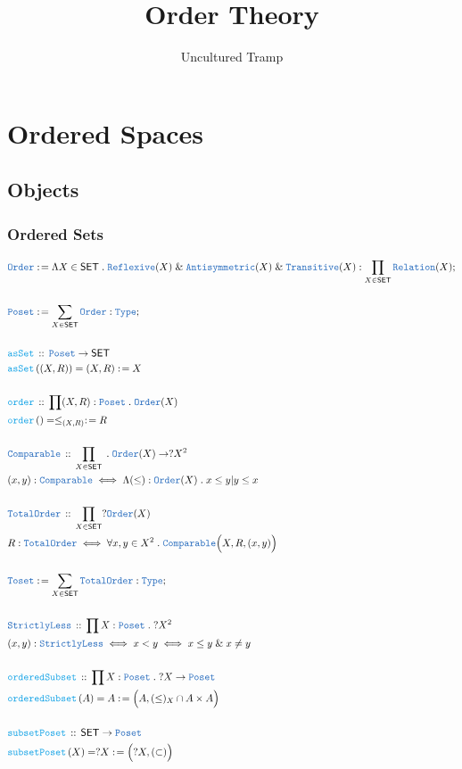 \documentclass[12pt]{scrartcl}
\author{Uncultured Tramp}
\title{Order Theory}
\newcommand{\TYPE}[1]{\textcolor{NavyBlue}{\mathtt{#1}}}
\newcommand{\FUNC}[1]{\textcolor{Cerulean}{\mathtt{#1}}}
\renewcommand{\.}{\; . \;}
\newcommand{\de}{: \kern 0.1pc =}
\newcommand{\Act}[1]{\left( #1 \right)}
\newcommand{\DeclareType}[2]{& \TYPE{#1} \, :: \, #2 \\}
\newcommand{\DefineType}[3]{& #1 : \TYPE{#2} \iff #3 \\}
\newcommand{\DefineNamedType}[4]{& #1 : \TYPE{#2} \iff #3 \iff #4 \\}
\newcommand{\DeclareFunc}[2]{& \FUNC{#1} \, :: \, #2 \\}
\newcommand{\DefineNamedFunc}[4]{&  \FUNC{#1}\Act{#2} = #3 \de #4 \\}
\newcommand{\Page}[1]{ \begin{align*} #1 \end{align*}   }
\renewcommand{\And}{\; \& \;}
\newcommand{\Type}{\TYPE{Type}}
\newcommand{\Conclude}[3]{& #1 \de #2 : #3; \\}
\newcommand{\SET}{\mathsf{SET}}
\newcommand{\Poset}{\TYPE{Poset}}
\begin{document}
\maketitle
\newpage
\tableofcontents
\newpage
\section{Ordered Spaces}
\subsection{Objects}
\subsubsection{Ordered Sets}
\Page{
	\Conclude{\TYPE{Order}}{
		\Lambda X \in \SET \. 
		\TYPE{Reflexive}(X)\And \TYPE{Antisymmetric}(X) \And \TYPE{Transitive}(X)}
	{\prod_{X \in \SET} \TYPE{Relation}(X)}
	\\
	\Conclude{\Poset}{ \sum_{X \in \SET} \TYPE{Order}}{ \Type }
	\\
	\DeclareFunc{asSet}{\Poset \to \SET}
	\DefineNamedFunc{asSet}{(X,R)}{(X,R)}{X}
	\\
	\DeclareFunc{order}{\prod (X,R) : \Poset \. \TYPE{Order}(X)}
	\DefineNamedFunc{order}{}{\le_{(X,R)}}{R}	
	\\
	\DeclareType{Comparable}{\prod_{X \in \SET} \. \TYPE{Order}(X) \to  ?X^2}
	\DefineType{(x,y)}{Comparable}{\Lambda (\le) : \TYPE{Order}(X) \. x \le y | y \le x}
	\\
	\DeclareType{TotalOrder}{\prod_{X  \in \SET}?\TYPE{Order}(X)}
	\DefineType{R}{TotalOrder}{\forall x,y \in X^2 \. \TYPE{Comparable}\Big(X,R,(x,y)\Big)}
	\\
	\Conclude{\TYPE{Toset}}{ \sum_{X \in \SET} \TYPE{TotalOrder}}{ \Type }
	\\
	\DeclareType{StrictlyLess}{\prod X : \Poset \. ?X^2}
	\DefineNamedType{(x,y)}{StrictlyLess}{x < y }{x \le y \And x \neq y}
	\\
	\DeclareFunc{orderedSubset}{\prod X : \Poset \. ?X \to \Poset}
	\DefineNamedFunc{orderedSubset}{A}{A}{\Big(A,(\le)_X \cap A\times A\Big)}
	\\
	\DeclareFunc{subsetPoset}{\SET \to \Poset}
	\DefineNamedFunc{subsetPoset}{X}{?X}{\Big(?X, (\subset) \Big)}
}
\end{document}
